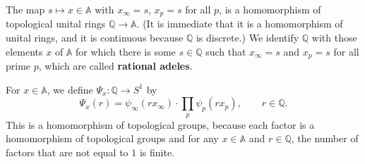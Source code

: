 \documentclass{article}
\theoremstyle{definition}
\begin{document}
The map $s \mapsto x \in \mathbb{A}$ with $x_\infty=s$, $x_p=s$ for all $p$, is a homomorphism
of topological  unital rings $\mathbb{Q} \to \mathbb{A}$. (It is immediate that it is a homomorphism of unital rings, and it is continuous because
$\mathbb{Q}$ is discrete.) We identify $\mathbb{Q}$ with those elements $x$ of $\mathbb{A}$ for which there is some $s \in \mathbb{Q}$
such that $x_\infty=s$ and $x_p=s$ for all prime $p$, which are called \textbf{rational adeles}.


For $x \in \mathbb{A}$, we define $\Psi_x:\mathbb{Q} \to S^1$ by
\[
\Psi_x(r) = \psi_\infty(rx_\infty) \cdot \prod_p \psi_p(rx_p), \qquad r \in \mathbb{Q}.
\]
This is a homomorphism of topological groups, because each factor is a homomorphism of topological groups
 and for any $x \in \mathbb{A}$ and $r \in
\mathbb{Q}$, the number of factors that are not equal to $1$ is finite.
\end{document}
